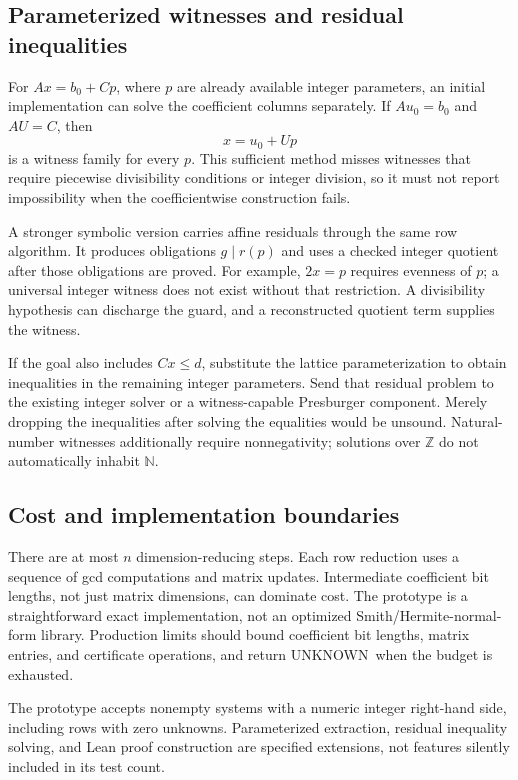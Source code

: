\documentclass[11pt,a4paper]{article}
\newcommand{\unknown}{\textnormal{UNKNOWN}}
\newcommand{\Z}{\mathbb{Z}}
\newcommand{\N}{\mathbb{N}}
\begin{document}
\subsection{Parameterized witnesses and residual inequalities}

For $Ax=b_0+Cp$, where $p$ are already available integer parameters, an initial implementation can solve the coefficient columns separately. If $Au_0=b_0$ and $AU=C$, then
\[
x=u_0+Up
\]
is a witness family for every $p$. This sufficient method misses witnesses that require piecewise divisibility conditions or integer division, so it must not report impossibility when the coefficientwise construction fails.

A stronger symbolic version carries affine residuals through the same row algorithm. It produces obligations $g\mid r(p)$ and uses a checked integer quotient after those obligations are proved. For example, $2x=p$ requires evenness of $p$; a universal integer witness does not exist without that restriction. A divisibility hypothesis can discharge the guard, and a reconstructed quotient term supplies the witness.

If the goal also includes $Cx\leq d$, substitute the lattice parameterization to obtain inequalities in the remaining integer parameters. Send that residual problem to the existing integer solver or a witness-capable Presburger component. Merely dropping the inequalities after solving the equalities would be unsound. Natural-number witnesses additionally require nonnegativity; solutions over $\Z$ do not automatically inhabit $\N$.

\subsection{Cost and implementation boundaries}

There are at most $n$ dimension-reducing steps. Each row reduction uses a sequence of gcd computations and matrix updates. Intermediate coefficient bit lengths, not just matrix dimensions, can dominate cost. The prototype is a straightforward exact implementation, not an optimized Smith/Hermite-normal-form library. Production limits should bound coefficient bit lengths, matrix entries, and certificate operations, and return \unknown\ when the budget is exhausted.

The prototype accepts nonempty systems with a numeric integer right-hand side, including rows with zero unknowns. Parameterized extraction, residual inequality solving, and Lean proof construction are specified extensions, not features silently included in its test count.
\end{document}
